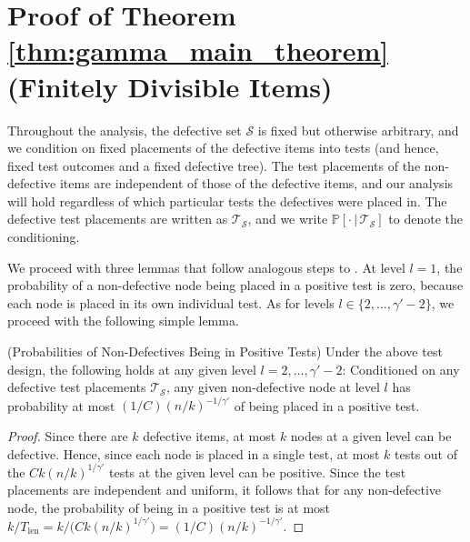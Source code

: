 
\section{Proof of Theorem \ref{thm:gamma_main_theorem} (Finitely Divisible Items)} \label{sec:gamma_algo_analysis}
Throughout the analysis, the defective set $\mathcal{S}$ is fixed but otherwise arbitrary, and we condition on fixed placements of the defective items into tests (and hence, fixed test outcomes and a fixed defective tree). The test placements of the non-defective items are independent of those of the defective items, and our analysis will hold regardless of which particular tests the defectives were placed in. The defective test placements are written as $\mathcal{T}_{\mathcal{S}}$, and we write $\mathbb{P}[\cdot \,|\,  \mathcal{T}_{\mathcal{S}}]$ to denote the conditioning.

We proceed with three lemmas that follow analogous steps to \cite{Eri20}.  At level $l=1$, the probability of a non-defective node being placed in a positive test is zero, because each node is placed in its own individual test. As for levels $l \in \{2,\dotsc,\gamma'-2\}$, we proceed with the following simple lemma.

\begin{lemma} \label{lem:gamma_prob_of_nondef_node_being_in_pos_test} {\textup{(Probabilities of Non-Defectives Being in Positive Tests)}}
Under the above test design, the following holds at any given level $l=2,\dots,\gamma'-2$: Conditioned on any defective test placements $\mathcal{T}_{\mathcal{S}}$, any given non-defective node at level $l$ has probability at most $(1/C)(n/k)^{-1/\gamma'}$ of being placed in a positive test.
\end{lemma} 

\begin{proof}
Since there are $k$ defective items, at most $k$ nodes at a given level can be defective. Hence, since each node is placed in a single test, at most $k$ tests out of the $Ck(n/k)^{1/\gamma'}$ tests at the given level can be positive. Since the test placements are independent and uniform, it follows that for any non-defective node, the probability of being in a positive test is at most $k/T_{\text{len}}=k/\big(Ck(n/k)^{1/\gamma'}\big)=(1/C)(n/k)^{-1/\gamma'}$.
\end{proof}

